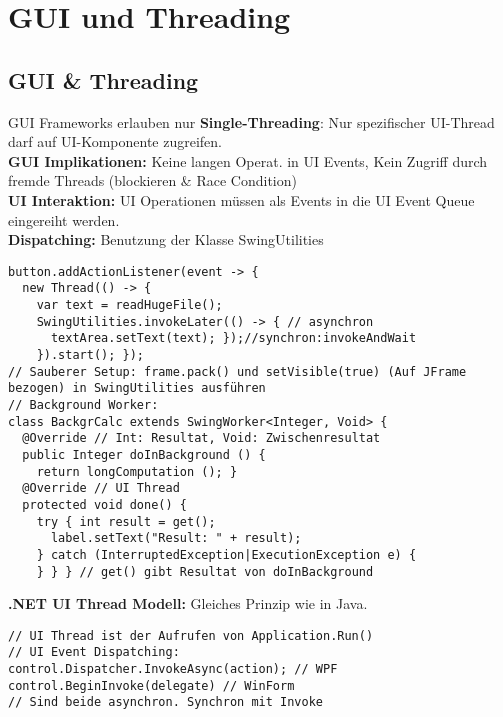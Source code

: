 
\section{GUI und Threading}
\subsection{GUI \& Threading}
GUI Frameworks erlauben nur \textbf{Single-Threading}: Nur spezifischer UI-Thread darf auf UI-Komponente zugreifen.\\
\textcolor{b}{\textbf{GUI Implikationen:}} Keine langen Operat. in UI Events, Kein Zugriff durch fremde Threads (blockieren \& Race Condition)\\
\textcolor{b}{\textbf{UI Interaktion:}} UI Operationen müssen als Events in die UI Event Queue eingereiht werden.\\
\textcolor{b}{\textbf{Dispatching:}} Benutzung der Klasse \textcolor{b}{SwingUtilities}
\begin{lstlisting}
button.addActionListener(event -> {
  new Thread(() -> {
    var text = readHugeFile();
    SwingUtilities.invokeLater(() -> { // asynchron
      textArea.setText(text); });//synchron:invokeAndWait
    }).start(); });
// Sauberer Setup: frame.pack() und setVisible(true) (Auf JFrame bezogen) in SwingUtilities ausführen
// Background Worker:
class BackgrCalc extends SwingWorker<Integer, Void> {
  @Override // Int: Resultat, Void: Zwischenresultat
  public Integer doInBackground () {
    return longComputation (); }
  @Override // UI Thread
  protected void done() {
    try { int result = get();
      label.setText("Result: " + result);
    } catch (InterruptedException|ExecutionException e) {
    } } } // get() gibt Resultat von doInBackground
\end{lstlisting}
\textcolor{b}{\textbf{.NET UI Thread Modell:}} Gleiches Prinzip wie in Java.
\begin{lstlisting}
// UI Thread ist der Aufrufen von Application.Run()
// UI Event Dispatching:
control.Dispatcher.InvokeAsync(action); // WPF
control.BeginInvoke(delegate) // WinForm
// Sind beide asynchron. Synchron mit Invoke
\end{lstlisting}
